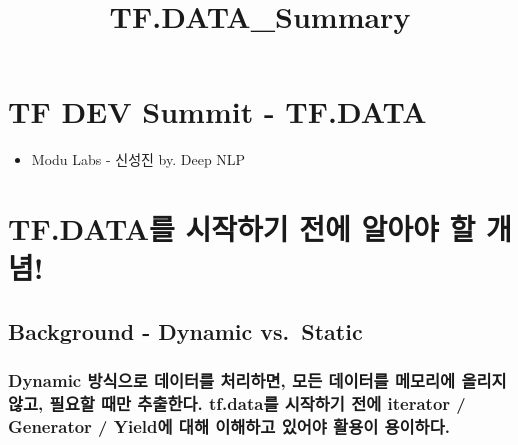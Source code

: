 \documentclass[11pt]{article}
\title{TF.DATA\_Summary}
\providecommand{\tightlist}{%
      \setlength{\itemsep}{0pt}\setlength{\parskip}{0pt}}
\begin{document}
    
    
    \maketitle
    
    

    
    \hypertarget{tf-dev-summit---tf.data}{%
\section{TF DEV Summit - TF.DATA}\label{tf-dev-summit---tf.data}}

\begin{itemize}
\tightlist
\item
  Modu Labs - 신성진 by. Deep NLP
\end{itemize}

    \hypertarget{tf.datauxb97c-uxc2dcuxc791uxd558uxae30-uxc804uxc5d0-uxc54cuxc544uxc57c-uxd560-uxac1cuxb150}{%
\section{TF.DATA를 시작하기 전에 알아야 할
개념!}\label{tf.datauxb97c-uxc2dcuxc791uxd558uxae30-uxc804uxc5d0-uxc54cuxc544uxc57c-uxd560-uxac1cuxb150}}

\hypertarget{background---dynamic-vs.static}{%
\subsection{Background - Dynamic
vs.~Static}\label{background---dynamic-vs.static}}

\hypertarget{dynamic-uxbc29uxc2dduxc73cuxb85c-uxb370uxc774uxd130uxb97c-uxcc98uxb9acuxd558uxba74-uxbaa8uxb4e0-uxb370uxc774uxd130uxb97c-uxba54uxbaa8uxb9acuxc5d0-uxc62cuxb9acuxc9c0-uxc54auxace0-uxd544uxc694uxd560-uxb54cuxb9cc-uxcd94uxcd9cuxd55cuxb2e4.-tf.datauxb97c-uxc2dcuxc791uxd558uxae30-uxc804uxc5d0-iterator-generator-yielduxc5d0-uxb300uxd574-uxc774uxd574uxd558uxace0-uxc788uxc5b4uxc57c-uxd65cuxc6a9uxc774-uxc6a9uxc774uxd558uxb2e4.}{%
\subsubsection{Dynamic 방식으로 데이터를 처리하면, 모든 데이터를
메모리에 올리지 않고, 필요할 때만 추출한다. tf.data를 시작하기 전에
iterator / Generator / Yield에 대해 이해하고 있어야 활용이
용이하다.}\label{dynamic-uxbc29uxc2dduxc73cuxb85c-uxb370uxc774uxd130uxb97c-uxcc98uxb9acuxd558uxba74-uxbaa8uxb4e0-uxb370uxc774uxd130uxb97c-uxba54uxbaa8uxb9acuxc5d0-uxc62cuxb9acuxc9c0-uxc54auxace0-uxd544uxc694uxd560-uxb54cuxb9cc-uxcd94uxcd9cuxd55cuxb2e4.-tf.datauxb97c-uxc2dcuxc791uxd558uxae30-uxc804uxc5d0-iterator-generator-yielduxc5d0-uxb300uxd574-uxc774uxd574uxd558uxace0-uxc788uxc5b4uxc57c-uxd65cuxc6a9uxc774-uxc6a9uxc774uxd558uxb2e4.}}
\end{document}
